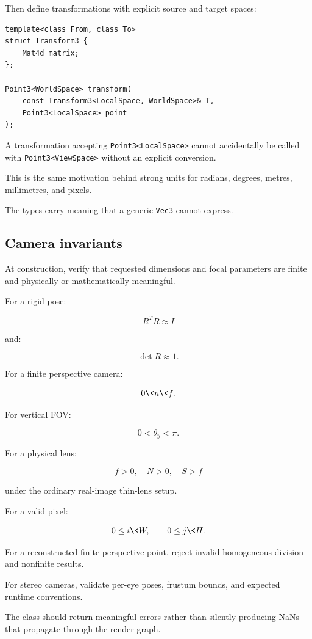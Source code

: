 Then define transformations with explicit source and target spaces:

\begin{verbatim}
template<class From, class To>
struct Transform3 {
    Mat4d matrix;
};

Point3<WorldSpace> transform(
    const Transform3<LocalSpace, WorldSpace>& T,
    Point3<LocalSpace> point
);
\end{verbatim}

A transformation accepting \texttt{Point3\textless{}LocalSpace\textgreater{}} cannot accidentally be called with \texttt{Point3\textless{}ViewSpace\textgreater{}} without an explicit conversion.

This is the same motivation behind strong units for radians, degrees, metres, millimetres, and pixels.

The types carry meaning that a generic \texttt{Vec3} cannot express.

\subsection{Camera invariants}\label{02-foundations-ii-ch037-camera-invariants}

At construction, verify that requested dimensions and focal parameters are finite and physically or mathematically meaningful.

For a rigid pose:

\[ R^TR\approx I \]

and:

\[ \det R\approx1. \]

For a finite perspective camera:

\[ 0\<n\<f. \]

For vertical FOV:

\[ 0<\theta_y<\pi. \]

For a physical lens:

\[ f>0,\quad N>0,\quad S>f \]

under the ordinary real-image thin-lens setup.

For a valid pixel:

\[ 0\le i\<W,\qquad0\le j\<H. \]

For a reconstructed finite perspective point, reject invalid homogeneous division and nonfinite results.

For stereo cameras, validate per-eye poses, frustum bounds, and expected runtime conventions.

The class should return meaningful errors rather than silently producing NaNs that propagate through the render graph.

